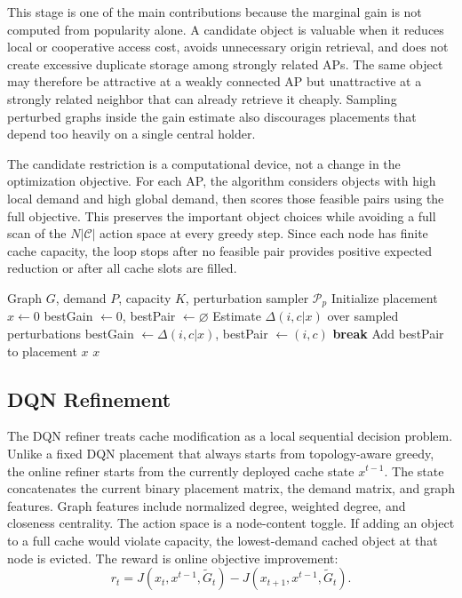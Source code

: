 This stage is one of the main contributions because the marginal gain is not computed from popularity alone. A candidate object is valuable when it reduces local or cooperative access cost, avoids unnecessary origin retrieval, and does not create excessive duplicate storage among strongly related APs. The same object may therefore be attractive at a weakly connected AP but unattractive at a strongly related neighbor that can already retrieve it cheaply. Sampling perturbed graphs inside the gain estimate also discourages placements that depend too heavily on a single central holder.

The candidate restriction is a computational device, not a change in the optimization objective. For each AP, the algorithm considers objects with high local demand and high global demand, then scores those feasible pairs using the full objective. This preserves the important object choices while avoiding a full scan of the \(N|\mathcal{C}|\) action space at every greedy step. Since each node has finite cache capacity, the loop stops after no feasible pair provides positive expected reduction or after all cache slots are filled.

\begin{algorithm}[t]
\caption{Topology-Aware Greedy Placement}
\label{alg:greedy_final}
\begin{algorithmic}[1]
\Require Graph \(G\), demand \(P\), capacity \(K\), perturbation sampler \(\mathcal{P}_p\)
\State Initialize placement \(x\gets 0\)
    \State bestGain \(\gets 0\), bestPair \(\gets \varnothing\)
        \State Estimate \(\Delta(i,c|x)\) over sampled perturbations
            \State bestGain \(\gets \Delta(i,c|x)\), bestPair \(\gets (i,c)\)
        \EndIf
    \EndFor
        \State \textbf{break}
    \EndIf
    \State Add bestPair to placement \(x\)
\EndWhile
\State \Return \(x\)
\end{algorithmic}
\end{algorithm}

\subsection{DQN Refinement}

The DQN refiner treats cache modification as a local sequential decision problem. Unlike a fixed DQN placement that always starts from topology-aware greedy, the online refiner starts from the currently deployed cache state \(x^{t-1}\). The state concatenates the current binary placement matrix, the demand matrix, and graph features. Graph features include normalized degree, weighted degree, and closeness centrality. The action space is a node-content toggle. If adding an object to a full cache would violate capacity, the lowest-demand cached object at that node is evicted. The reward is online objective improvement:
\[
r_t=J(x_t,x^{t-1},\tilde{G}_t)-J(x_{t+1},x^{t-1},\tilde{G}_t).
\]

